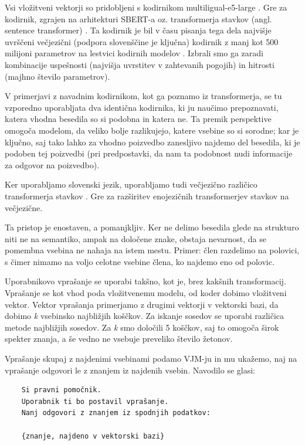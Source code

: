 \documentclass[a4paper,12pt,openright]{book}
\begin{document}
Vsi vložitveni vektorji so pridobljeni s kodirnikom multiligual-e5-large \cite{multilingual-e5-large}. Gre za kodirnik, zgrajen na arhitekturi SBERT-a oz. transformerja stavkov (angl. sentence transformer) \cite{sbert}. Ta kodirnik je bil v času pisanja tega dela najvišje uvrščeni večjezični (podpora slovenščine je ključna) kodirnik z manj kot 500 milijoni parametrov na lestvici kodirnih modelov \cite{mteb}. Izbrali smo ga zaradi kombinacije uspešnosti (najvišja uvrstitev v zahtevanih pogojih) in hitrosti (majhno število parametrov).

V primerjavi z navadnim kodirnikom, kot ga poznamo iz transformerja, se tu vzporedno uporabljata dva identična kodirnika, ki ju naučimo prepoznavati, katera vhodna besedila so si podobna in katera ne. Ta premik perspektive omogoča modelom, da veliko bolje razlikujejo, katere vsebine so si sorodne; kar je ključno, saj tako lahko za vhodno poizvedbo zanesljivo najdemo del besedila, ki je podoben tej poizvedbi (pri predpostavki, da nam ta podobnost nudi informacije za odgovor na poizvedbo).

Ker uporabljamo slovenski jezik, uporabljamo tudi večjezično različico transformerja stavkov \cite{multilingual-sbert}. Gre za razširitev enojezičnih transformerjev stavkov na večjezične.

Ta pristop je enostaven, a pomanjkljiv. Ker ne delimo besedila glede na strukturo niti ne na semantiko, ampak na določene znake, obstaja nevarnost, da se pomembna vsebina ne nahaja na istem mestu. Primer: člen razdelimo na polovici, s čimer nimamo na voljo celotne vsebine člena, ko najdemo eno od polovic.

Uporabnikovo vprašanje se uporabi takšno, kot je, brez kakšnih transformacij. Vprašanje se kot vhod poda vložitvenemu modelu, od koder dobimo vložitveni vektor. Vektor vprašanja primerjamo z drugimi vektorji v vektorski bazi, da dobimo \textit{k} vsebinsko najbližjih koščkov. Za iskanje sosedov se uporabi različica metode najbližjih sosedov. Za \textit{k} smo določili 5 koščkov, saj to omogoča širok spekter znanja, a še vedno ne vsebuje preveliko število žetonov.

Vprašanje skupaj z najdenimi vsebinami podamo VJM-ju in mu ukažemo, naj na vprašanje odgovori le z znanjem iz najdenih vsebin. Navodilo se glasi:

\begin{verbatim}
    Si pravni pomočnik.
    Uporabnik ti bo postavil vprašanje.
    Nanj odgovori z znanjem iz spodnjih podatkov:

    {znanje, najdeno v vektorski bazi}
\end{verbatim}
\end{document}
